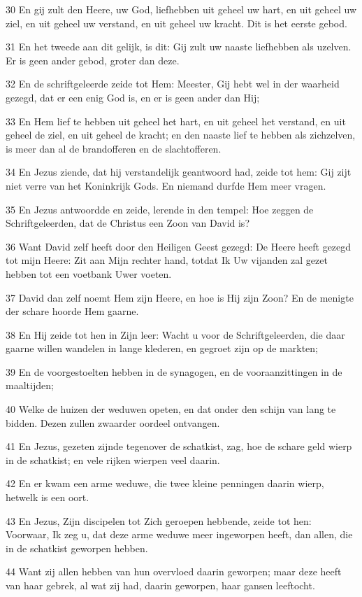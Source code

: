 \par 30 En gij zult den Heere, uw God, liefhebben uit geheel uw hart, en uit geheel uw ziel, en uit geheel uw verstand, en uit geheel uw kracht. Dit is het eerste gebod.
\par 31 En het tweede aan dit gelijk, is dit: Gij zult uw naaste liefhebben als uzelven. Er is geen ander gebod, groter dan deze.
\par 32 En de schriftgeleerde zeide tot Hem: Meester, Gij hebt wel in der waarheid gezegd, dat er een enig God is, en er is geen ander dan Hij;
\par 33 En Hem lief te hebben uit geheel het hart, en uit geheel het verstand, en uit geheel de ziel, en uit geheel de kracht; en den naaste lief te hebben als zichzelven, is meer dan al de brandofferen en de slachtofferen.
\par 34 En Jezus ziende, dat hij verstandelijk geantwoord had, zeide tot hem: Gij zijt niet verre van het Koninkrijk Gods. En niemand durfde Hem meer vragen.
\par 35 En Jezus antwoordde en zeide, lerende in den tempel: Hoe zeggen de Schriftgeleerden, dat de Christus een Zoon van David is?
\par 36 Want David zelf heeft door den Heiligen Geest gezegd: De Heere heeft gezegd tot mijn Heere: Zit aan Mijn rechter hand, totdat Ik Uw vijanden zal gezet hebben tot een voetbank Uwer voeten.
\par 37 David dan zelf noemt Hem zijn Heere, en hoe is Hij zijn Zoon? En de menigte der schare hoorde Hem gaarne.
\par 38 En Hij zeide tot hen in Zijn leer: Wacht u voor de Schriftgeleerden, die daar gaarne willen wandelen in lange klederen, en gegroet zijn op de markten;
\par 39 En de voorgestoelten hebben in de synagogen, en de vooraanzittingen in de maaltijden;
\par 40 Welke de huizen der weduwen opeten, en dat onder den schijn van lang te bidden. Dezen zullen zwaarder oordeel ontvangen.
\par 41 En Jezus, gezeten zijnde tegenover de schatkist, zag, hoe de schare geld wierp in de schatkist; en vele rijken wierpen veel daarin.
\par 42 En er kwam een arme weduwe, die twee kleine penningen daarin wierp, hetwelk is een oort.
\par 43 En Jezus, Zijn discipelen tot Zich geroepen hebbende, zeide tot hen: Voorwaar, Ik zeg u, dat deze arme weduwe meer ingeworpen heeft, dan allen, die in de schatkist geworpen hebben.
\par 44 Want zij allen hebben van hun overvloed daarin geworpen; maar deze heeft van haar gebrek, al wat zij had, daarin geworpen, haar gansen leeftocht.

